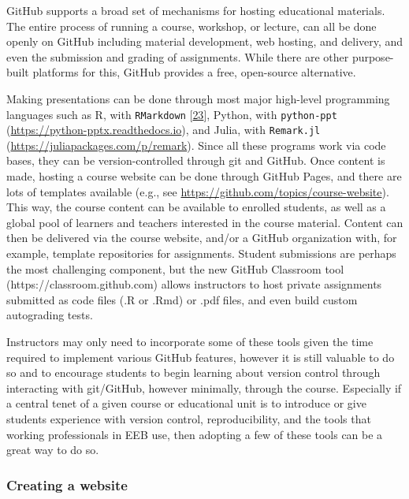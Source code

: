 GitHub supports a broad set of mechanisms for hosting educational materials.
The entire process of running a course, workshop, or lecture, can all be done openly on GitHub including material development, web hosting, and delivery, and even the submission and grading of assignments.
While there are other purpose-built platforms for this, GitHub provides a free, open-source alternative.

Making presentations can be done through most major high-level programming languages such as R, with \texttt{RMarkdown} {[}\protect\hyperlink{ref-QqMezOMg}{23}{]}, Python, with \texttt{python-ppt} (\url{https://python-pptx.readthedocs.io}), and Julia, with \texttt{Remark.jl} (\url{https://juliapackages.com/p/remark}).
Since all these programs work via code bases, they can be version-controlled through git and GitHub.
Once content is made, hosting a course website can be done through GitHub Pages, and there are lots of templates available (e.g., see \url{https://github.com/topics/course-website}).
This way, the course content can be available to enrolled students, as well as a global pool of learners and teachers interested in the course material.
Content can then be delivered via the course website, and/or a GitHub organization with, for example, template repositories for assignments.
Student submissions are perhaps the most challenging component, but the new GitHub Classroom tool (https://classroom.github.com) allows instructors to host private assignments submitted as code files (.R or .Rmd) or .pdf files, and even build custom autograding tests.

Instructors may only need to incorporate some of these tools given the time required to implement various GitHub features, however it is still valuable to do so and to encourage students to begin learning about version control through interacting with git/GitHub, however minimally, through the course.
Especially if a central tenet of a given course or educational unit is to introduce or give students experience with version control, reproducibility, and the tools that working professionals in EEB use, then adopting a few of these tools can be a great way to do so.

\hypertarget{creating-a-website}{%
\subsubsection{Creating a website}\label{creating-a-website}}

